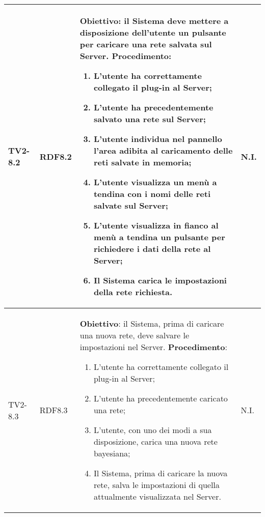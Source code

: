 \begin{longtable}{|C{.15\textwidth}|C{.13\textwidth}|m{.65\textwidth}|C{.08\textwidth}|}
TV2-8.2 & RDF8.2 &
	\textbf{Obiettivo}: il Sistema deve mettere a disposizione dell'utente un pulsante per caricare una rete salvata sul Server. \newline
	\textbf{Procedimento}:
	\begin{enumerate}
		\item L'utente ha correttamente collegato il plug-in al Server;
		\item L'utente ha precedentemente salvato una rete sul Server;
		\item L'utente individua nel pannello l'area adibita al caricamento delle reti salvate in memoria;
		\item L'utente visualizza un menù a tendina con i nomi delle reti salvate sul Server;
		\item L'utente visualizza in fianco al menù a tendina un pulsante per richiedere i dati della rete al Server;
		\item Il Sistema carica le impostazioni della rete richiesta.
	\end{enumerate}
	& N.I. \\
\hline

TV2-8.3 & RDF8.3 &
	\textbf{Obiettivo}: il Sistema, prima di caricare una nuova rete, deve salvare le impostazioni nel Server. \newline
	\textbf{Procedimento}:
	\begin{enumerate}
		\item L'utente ha correttamente collegato il plug-in al Server;
		\item L'utente ha precedentemente caricato una rete;
		\item L'utente, con uno dei modi a sua disposizione, carica una nuova rete bayesiana;
		\item Il Sistema, prima di caricare la nuova rete, salva le impostazioni di quella attualmente visualizzata nel Server.
	\end{enumerate}
	& N.I. \\
\hline	


\end{longtable}
